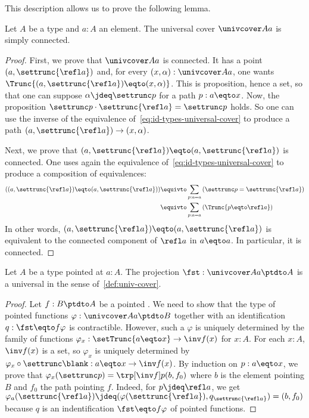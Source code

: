 This description allows us to prove the following lemma.
\begin{lemma}
  \label{lemma:universal-cover-simply-connected}%
  Let $A$ be a type and $a:A$ an element. The universal cover
  $\univcover A a$ is simply connected.
\end{lemma}
\begin{proof}
  First, we prove that $\univcover A a$ is connected. It has a point
  $(a,\settrunc{\refl a})$ and, for every $(x,\alpha):\univcover A a$, one wants
  $\Trunc{(a,\settrunc{\refl a}) \eqto (x,\alpha)}$. This is proposition, hence
  a set, so that one can suppose $\alpha \jdeq \settrunc p$ for a path
  $p:a\eqto x$. Now, the proposition
  $\settrunc p \cdot \settrunc {\refl a} = \settrunc p$ holds. So one can use
  the inverse of the equivalence of~\cref{eq:id-types-universal-cover} to
  produce a path $(a,\settrunc{\refl a}) \to (x,\alpha)$.

  Next, we prove that $(a,\settrunc{\refl a}) \eqto (a,\settrunc{\refl a})$ is
  connected. One uses again the equivalence
  of~\cref{eq:id-types-universal-cover} to produce a composition of
  equivalences:
  \begin{align*}
    \left((a,\settrunc{\refl a}) \eqto (a,\settrunc{\refl a})\right)
    &\equivto \sum_{p:a=a}\left( \settrunc p = \settrunc{\refl a} \right)
    \\
    &\equivto \sum_{p:a=a}\left( \Trunc {p \eqto \refl a} \right)
  \end{align*}
  In other words, $(a,\settrunc{\refl a}) \eqto (a,\settrunc{\refl a})$ is
  equivalent to the connected component of $\refl a$ in $a\eqto a$. In
  particular, it is connected.
\end{proof}

\begin{lemma}
  \label{lemma:universal-cover-is-universal}
  Let $A$ be a type pointed at $a:A$. The projection $\fst : \univcover A a \ptdto A$ is a universal \covering{} in the sense of~\cref{def:univ-cover}.
\end{lemma}
\begin{proof}
  Let $f : B \ptdto A$ be a pointed \covering{}. We need to show that the type of pointed functions $\varphi : \univcover A a \ptdto B$ together
  with an identification $q : \fst \eqto f \varphi$ is contractible. However, such a $\varphi$ is uniquely determined by the family of functions
  $\varphi_x : \setTrunc{ a \eqto x } \to \inv f (x)$ for $x : A$. For each $x : A$, $\inv f (x)$ is a set, so $\varphi_x$ is uniquely
  determined by $\varphi_x \circ \settrunc\blank : a \eqto x \to \inv f (x)$. By induction on $p : a \eqto x$, we prove that
  $\varphi_x (\settrunc p) = \trp [\inv f] p (b , f_0) $ where $b$ is the element pointing $B$ and $f_0$ the path pointing $f$. Indeed, for
  $p \jdeq \refl a$, we get $\varphi_a (\settrunc {\refl a}) \jdeq (\varphi (\settrunc {\refl a}) , q_{\settrunc {\refl a}}) = (b , f_0)$
  because $q$ is an indentification $\fst \eqto f \varphi$ of pointed functions.
\end{proof}

